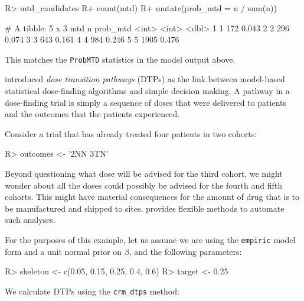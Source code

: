 \documentclass[article]{jss}
\begin{document}
\begin{CodeChunk}

\begin{CodeInput}
R> mtd_candidates %
R+   count(mtd) %
R+   mutate(prob_mtd = n / sum(n))
\end{CodeInput}

\begin{CodeOutput}
# A tibble: 5 x 3
    mtd     n prob_mtd
  <int> <int>    <dbl>
1     1   172    0.043
2     2   296    0.074
3     3   643    0.161
4     4   984    0.246
5     5  1905    0.476
\end{CodeOutput}
\end{CodeChunk}

This matches the \texttt{ProbMTD} statistics in the model output above.

\citet{Yap2017} introduced \textit{dose transition pathways} (DTPs) as
the link between model-based statistical dose-finding algorithms and
simple decision making. A pathway in a dose-finding trial is simply a
sequence of doses that were delivered to patients and the outcomes that
the patients experienced.

Consider a trial that has already treated four patients in two cohorts:

\begin{CodeChunk}

\begin{CodeInput}
R> outcomes <- '2NN 3TN'
\end{CodeInput}
\end{CodeChunk}

Beyond questioning what dose will be advised for the third cohort, we
might wonder about all the doses could possibly be advised for the
fourth and fifth cohorts. This might have material consequences for the
amount of drug that is to be manufactured and shipped to sites.
 provides flexible methods to automate such analyses.

For the purposes of this example, let us assume we are using the
\texttt{empiric} model form and a unit normal prior on \(\beta\), and
the following parameters:

\begin{CodeChunk}

\begin{CodeInput}
R> skeleton <- c(0.05, 0.15, 0.25, 0.4, 0.6)
R> target <- 0.25
\end{CodeInput}
\end{CodeChunk}

We calculate DTPs using the \texttt{crm\_dtps} method:
\end{document}
